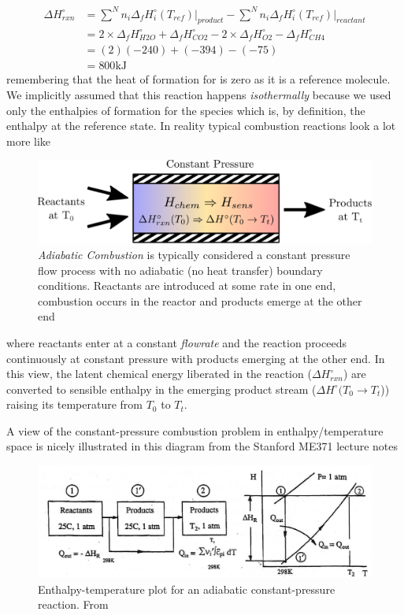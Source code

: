 \documentclass[twocolumn]{memoir} %
\begin{document}
\begin{equation}
    \begin{split}
        \Delta H^\circ_{rxn} &= \sum^N n_i \Delta_f H_{i}^\circ(T_{ref}) \vert_{product} - 
        \sum^N n_i \Delta_f H_{i}^\circ(T_{ref}) \vert_{reactant} \\
        &= 2\times \Delta_f H_{H2O}^\circ + \Delta_f H_{CO2}^\circ -
            2\times \Delta_f H_{O2}^\circ - \Delta_f H_{CH4}^\circ \\
        &= (2)(-240) + (-394)- (-75)\\
        &= 800 \text{kJ}
    \end{split}
\end{equation}
%
remembering that the heat of formation for  is zero as it is a reference molecule.  We implicitly assumed
that this reaction happens \emph{isothermally} because we used only the enthalpies of formation for the species
which is, by definition, the enthalpy at the reference state.  In reality typical combustion reactions look a 
lot more like
%
\begin{figure}[H]
    \includegraphics[width=\columnwidth]{adiabatic_combustion}
    \caption{\emph{Adiabatic Combustion} is typically considered a constant pressure flow process with no adiabatic
    (no heat transfer) boundary conditions.  Reactants are introduced at some rate in one end, combustion
    occurs in the reactor and products emerge at the other end}
    \label{fig:adiabatic_combustion}
\end{figure}
%
where reactants enter at a constant \emph{flowrate} and the reaction proceeds continuously at constant pressure
with products emerging at the other end.  In this view, the latent chemical energy liberated in the
reaction ($\Delta H_{rxn}^\circ$) are converted to sensible enthalpy in the emerging product
stream ($\Delta H^\circ(T_0 \rightarrow T_t$)) raising its temperature from $T_0$ to $T_t$.  

A view of the constant-pressure combustion problem in enthalpy/temperature space is nicely illustrated in this
diagram from the Stanford ME371 lecture notes\cite{me371}

\begin{figure}[H]
    \includegraphics[width=\columnwidth]{adiabatic_enthalpy_temp}
    \caption{Enthalpy-temperature plot for an adiabatic constant-pressure reaction.  From \cite{me371}}
\end{figure}
\end{document}
